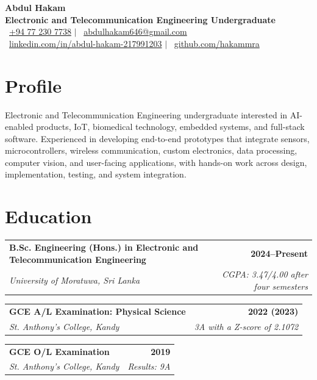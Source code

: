 \documentclass[a4paper,10pt]{article}
\makeatletter
\newcommand{\educationEntry}[4]{%
  \begin{tabularx}{\textwidth}{@{}Xr@{}}
    \textbf{#1} & \textbf{\small #2} \\
    \textit{#3} & \textit{\small #4}
  \end{tabularx}
}
\makeatother
\begin{document}
\fontsize{9.5}{11.25}\selectfont

\begin{center}
  {\LARGE\bfseries Abdul Hakam}\\[0.75mm]
  {\large\bfseries Electronic and Telecommunication Engineering Undergraduate}\\[1.5mm]

  \small
  \faPhone\ \href{tel:+94772307738}{+94 77 230 7738}
  \quad $\vert$ \quad
  \faEnvelope\ \href{mailto:abdulhakam646@gmail.com}{abdulhakam646@gmail.com}\\[0.8mm]

  \faLinkedin\ 
  \href{https://www.linkedin.com/in/abdul-hakam-217991203}
  {linkedin.com/in/abdul-hakam-217991203}
  \quad $\vert$ \quad
  \faGithub\ 
  \href{https://github.com/hakammra}
  {github.com/hakammra}
\end{center}

\vspace{-1.2mm}

\section{Profile}
Electronic and Telecommunication Engineering undergraduate interested in AI-enabled products, IoT, biomedical technology, embedded systems, and full-stack software. Experienced in developing end-to-end prototypes that integrate sensors, microcontrollers, wireless communication, custom electronics, data processing, computer vision, and user-facing applications, with hands-on work across design, implementation, testing, and system integration.
\section{Education}
\educationEntry
  {B.Sc. Engineering (Hons.) in Electronic and Telecommunication Engineering}
  {2024--Present}
  {University of Moratuwa, Sri Lanka}
  {CGPA: 3.47/4.00 after four semesters}

\vspace{1.35mm}
\educationEntry
  {GCE A/L Examination: Physical Science}
  {2022 (2023)}
  {St. Anthony's College, Kandy}
  {3A with a Z-score of 2.1072}

\vspace{1.35mm}
\educationEntry
  {GCE O/L Examination}
  {2019}
  {St. Anthony's College, Kandy}
  {Results: 9A}
\end{document}
